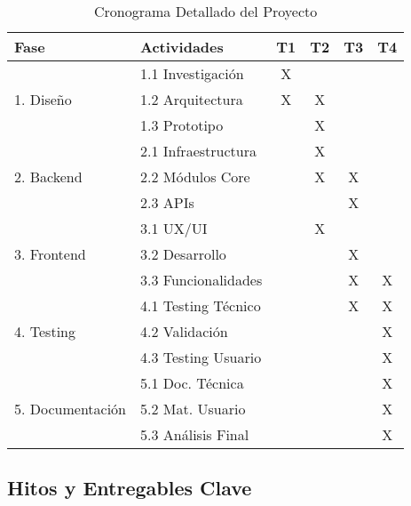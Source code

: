 \begin{table}[H]
    \centering
    \caption{Cronograma Detallado del Proyecto}
    \label{tab:cronograma_detallado}
    \small
    \begin{tabular}{|l|l|c|c|c|c|}
        \hline
        \textbf{Fase} & \textbf{Actividades} & \textbf{T1} & \textbf{T2} & \textbf{T3} & \textbf{T4} \\
        \hline
        \multirow{3}{*}{1. Diseño} & 1.1 Investigación & X & & & \\
        & 1.2 Arquitectura & X & X & & \\
        & 1.3 Prototipo & & X & & \\
        \hline
        \multirow{3}{*}{2. Backend} & 2.1 Infraestructura & & X & & \\
        & 2.2 Módulos Core & & X & X & \\
        & 2.3 APIs & & & X & \\
        \hline
        \multirow{3}{*}{3. Frontend} & 3.1 UX/UI & & X & & \\
        & 3.2 Desarrollo & & & X & \\
        & 3.3 Funcionalidades & & & X & X \\
        \hline
        \multirow{3}{*}{4. Testing} & 4.1 Testing Técnico & & & X & X \\
        & 4.2 Validación & & & & X \\
        & 4.3 Testing Usuario & & & & X \\
        \hline
        \multirow{3}{*}{5. Documentación} & 5.1 Doc. Técnica & & & & X \\
        & 5.2 Mat. Usuario & & & & X \\
        & 5.3 Análisis Final & & & & X \\
        \hline
    \end{tabular}
\end{table}

\subsection{Hitos y Entregables Clave}

